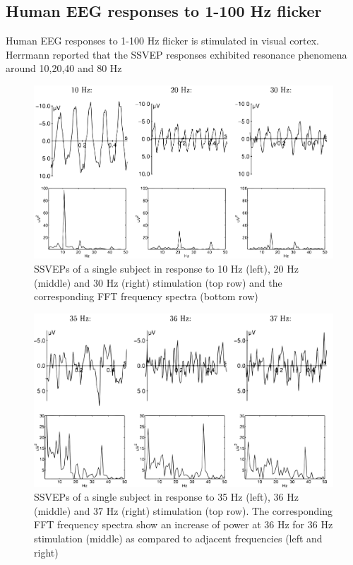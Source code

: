 \subsection {Human EEG responses to 1-100 Hz flicker\cite{ref8}}

\hspace{1.5cm} Human EEG responses to 1-100 Hz flicker is stimulated in visual cortex. Herrmann reported that the SSVEP responses exhibited resonance phenomena around 10,20,40 and 80 Hz

\begin{figure}[h]
	\centering
  	\includegraphics[scale = 0.2]{chapter2/26.pdf}
  	\caption{SSVEPs of a single subject in response to 10 Hz (left), 20 Hz (middle) and 30 Hz (right) stimulation (top row) and the corresponding FFT frequency spectra (bottom row)}
\end{figure}

\begin{figure}[h]
	\centering
  	\includegraphics[scale = 0.2]{chapter2/27.pdf}
  	\caption{SSVEPs of a single subject in response to 35 Hz (left), 36 Hz (middle) and 37 Hz (right) stimulation (top row). The corresponding FFT frequency spectra show an increase of power at 36 Hz for 36 Hz stimulation (middle) as compared to adjacent frequencies (left and right)}
\end{figure}

